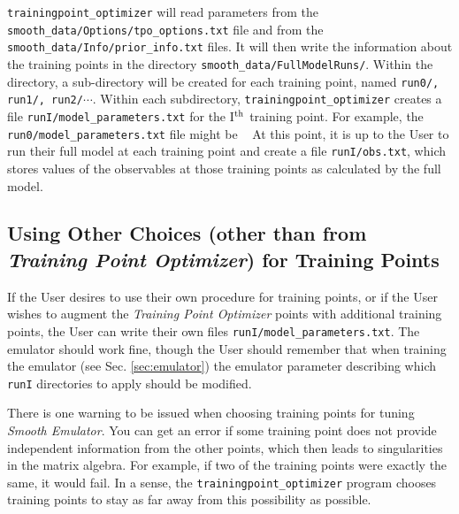 \documentclass[UserManual.tex]{subfiles}
\begin{document}
\begin{sloppypar}
{\tt trainingpoint\_optimizer} will read parameters from the {\tt smooth\_data/Options/tpo\_options.txt} file and from the {\tt smooth\_data/Info/prior\_info.txt} files. It will then write the information about the training points in the directory {\tt smooth\_data/FullModelRuns/}. Within the directory, a sub-directory will be created for each training point, named {\tt run0/, run1/, run2/}$\cdots$. Within each subdirectory, {\tt trainingpoint\_optimizer} creates a file {\tt runI/model\_parameters.txt} for the I$^{\rm th}$ training point. For example, the {\tt run0/model\_parameters.txt} file might be
{\tt\vspace*{-8pt}{\tt \begin{Verbatim}[commandchars=\\\{\}]
   NuclearCompressibility     229.08
   ScreeningMass              0.453
   Viscosity                  0.192
\end{Verbatim}
}\vspace*{-8pt}
}
At this point, it is up to the User to run their full model at each training point and create a file {\tt runI/obs.txt}, which stores values of the observables at those training points as calculated by the full model. 

\subsection{Using Other Choices (other than from {\it Training Point Optimizer}) for Training Points}

If the User desires to use their own procedure for training points, or if the User wishes to augment the {\it Training Point Optimizer} points with additional training points, the User can write their own files {\tt runI/model\_parameters.txt}. The emulator should work fine, though the User should remember that when training the emulator (see Sec. \ref{sec:emulator}) the emulator parameter describing which {\tt runI} directories to apply should be modified.

There is one warning to be issued when choosing training points for tuning {\it Smooth Emulator}. You can get an error if some training point does not provide independent information from the other points, which then leads to singularities in the matrix algebra.  For example, if two of the training points were exactly the same, it would fail. In a sense, the {\tt trainingpoint\_optimizer} program chooses training points to stay as far away from this possibility as possible.


\end{sloppypar}
\end{document}
